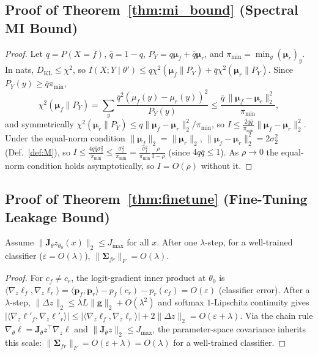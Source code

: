 \documentclass[smallextended]{svjour3}       %
\begin{document}
\subsection{Proof of Theorem~\ref{thm:mi_bound} (Spectral MI Bound)}
\label{app:mi_bound}
\begin{proof}
Let $q=P(X{=}f)$, $\bar{q}=1-q$, $P_Y=q\boldsymbol{\mu}_f+\bar{q}\boldsymbol{\mu}_r$, and $\pi_{\min}=\min_y (\boldsymbol{\mu}_r)_y$. In nats, $D_{\mathrm{KL}}\le\chi^2$, so $I(X;Y\mid\theta')\le q\chi^2(\boldsymbol{\mu}_f\|P_Y)+\bar{q}\chi^2(\boldsymbol{\mu}_r\|P_Y)$. Since $P_Y(y)\ge\bar{q}\pi_{\min}$,
\begin{equation}
\chi^2(\boldsymbol{\mu}_f\|P_Y)=\sum_y\frac{\bar{q}^2(\mu_f(y)-\mu_r(y))^2}{P_Y(y)}\le\frac{\bar{q}\,\|\boldsymbol{\mu}_f-\boldsymbol{\mu}_r\|_2^2}{\pi_{\min}},
\end{equation}
and symmetrically $\chi^2(\boldsymbol{\mu}_r\|P_Y)\le q\|\boldsymbol{\mu}_f-\boldsymbol{\mu}_r\|_2^2/\pi_{\min}$, so $I\le\frac{2q\bar{q}}{\pi_{\min}}\|\boldsymbol{\mu}_f-\boldsymbol{\mu}_r\|_2^2$. Under the equal-norm condition $\|\boldsymbol{\mu}_f\|_2=\|\boldsymbol{\mu}_r\|_2$, $\|\boldsymbol{\mu}_f-\boldsymbol{\mu}_r\|_2^2=2\sigma_2^2$ (Def.~\ref{def:M}), so $I\le\frac{4q\bar{q}\sigma_2^2}{\pi_{\min}}\le\frac{\sigma_2^2}{\pi_{\min}}=\frac{\sigma_1^2}{\pi_{\min}}\frac{\rho}{1-\rho}$ (since $4q\bar{q}\le1$). As $\rho\to0$ the equal-norm condition holds asymptotically, so $I=O(\rho)$ without it.
\end{proof}

\subsection{Proof of Theorem~\ref{thm:finetune} (Fine-Tuning Leakage Bound)}
\label{app:finetune}

\begin{lemma}
\label{lem:cross_cov}
Assume $\|\mathbf{J}_\theta z_{\theta_0}(x)\|_2 \le J_{\max}$ for all $x$. After one $\lambda$-step, for a well-trained classifier ($\varepsilon=O(\lambda)$), $\|\boldsymbol{\Sigma}_{fr}\|_F = O(\lambda)$.
\end{lemma}
\begin{proof}
For $c_f\neq c_r$, the logit-gradient inner product at $\theta_0$ is $\langle\nabla_z\ell_f,\nabla_z\ell_r\rangle=\langle\mathbf{p}_f,\mathbf{p}_r\rangle-p_f(c_r)-p_r(c_f)=O(\varepsilon)$ (classifier error). After a $\lambda$-step, $\|\Delta z\|_2\le\lambda L\|\mathbf{g}\|_2+O(\lambda^2)$ and softmax $1$-Lipschitz continuity gives $|\langle\nabla_z\ell'_f,\nabla_z\ell'_r\rangle|\le|\langle\nabla_z\ell_f,\nabla_z\ell_r\rangle|+2\|\Delta z\|_2=O(\varepsilon+\lambda)$. Via the chain rule $\nabla_\theta\ell=\mathbf{J}_\theta z^\top\nabla_z\ell$ and $\|\mathbf{J}_\theta z\|_2\le J_{\max}$, the parameter-space covariance inherits this scale: $\|\boldsymbol{\Sigma}_{fr}\|_F=O(\varepsilon+\lambda)=O(\lambda)$ for a well-trained classifier.
\end{proof}
\end{document}
